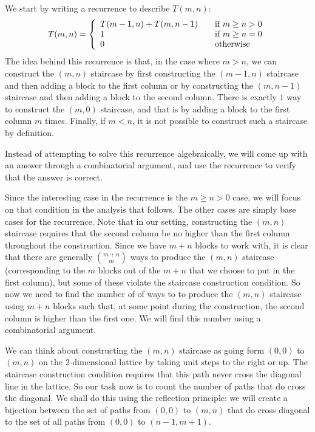 \documentclass[12pt]{amsart}
\begin{document}
We start by writing a recurrence to describe $T(m,n)$:
\begin{equation}
T(m,n) = \left\{ 
  \begin{array}{l l}
    T(m-1,n) + T(m,n-1) & \quad \text{if $m \geq n > 0$}\\
    1 & \quad \text{if $m \geq n = 0$}\\
    0 & \quad \text{otherwise}\\
  \end{array} \right.
\label{eqn:2-recurrence}
\end{equation}
The idea behind this recurrence is that, in the case where $m > n$, we can construct the $(m,n)$ staircase by first constructing the $(m-1,n)$ staircase and then adding a block to the first column or by constructing the $(m,n-1)$ staircase and then adding a block to the second column. There is exactly $1$ way to construct the $(m,0)$ staircase, and that is by adding a block to the first column $m$ times. Finally, if $m < n$, it is not possible to construct such a staircase by definition.

Instead of attempting to solve this recurrence algebraically, we will come up with an answer through a combinatorial argument, and use the recurrence to verify that the answer is correct.

Since the interesting case in the recurrence is the $m \geq n > 0$ case, we will focus on that condition in the analysis that follows. The other cases are simply base cases for the recurrence. Note that in our setting, constructing the $(m,n)$ staircase requires that the second column be no higher than the first column throughout the construction. Since we have $m+n$ blocks to work with, it is clear that there are generally $\binom{m+n}{m}$ ways to produce the $(m,n)$ staircase (corresponding to the $m$ blocks out of the $m+n$ that we choose to put in the first column), but some of these violate the staircase construction condition. So now we need to find the number of of ways to to produce the $(m,n)$ staircase using $m+n$ blocks such that, at some point during the construction, the second column is higher than the first one. We will find this number using a combinatorial argument.

We can think about constructing the $(m,n)$ staircase as going form $(0,0)$ to $(m,n)$ on the $2$-dimensional lattice by taking unit steps to the right or up. The staircase construction condition requires that this path never cross the diagonal line in the lattice. So our task now is to count the number of paths that do cross the diagonal. We shall do this using the reflection principle: we will create a bijection between the set of paths from $(0,0)$ to $(m,n)$ that do cross diagonal to the set of all paths from $(0,0)$ to $(n-1,m+1)$.
\end{document}
